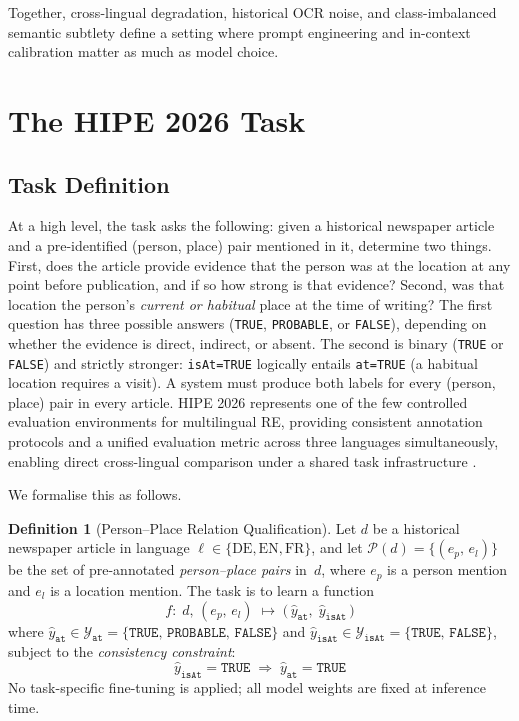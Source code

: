 \documentclass[
]{ceurart}
\theoremstyle{definition}
\newtheorem{defn}{Definition}
\begin{document}
Together, cross-lingual degradation, historical OCR noise, and class-imbalanced semantic subtlety define a setting where prompt engineering and in-context calibration matter as much as model choice.


\section{The HIPE 2026 Task}\label{sec:task}

\subsection{Task Definition}

At a high level, the task asks the following: given a historical newspaper article and a pre-identified (person, place) pair mentioned in it, determine two things.
First, does the article provide evidence that the person was at the location at any point before publication, and if so how strong is that evidence?
Second, was that location the person's \emph{current or habitual} place at the time of writing?
The first question has three possible answers (\texttt{TRUE}, \texttt{PROBABLE}, or \texttt{FALSE}), depending on whether the evidence is direct, indirect, or absent.
The second is binary (\texttt{TRUE} or \texttt{FALSE}) and strictly stronger: \texttt{isAt=TRUE} logically entails \texttt{at=TRUE} (a habitual location requires a visit).
A system must produce both labels for every (person, place) pair in every article.
HIPE 2026 \citep{opitz_extended_2026, opitz_overview_2026} represents one of the few controlled evaluation environments for multilingual RE, providing consistent annotation protocols and a unified evaluation metric across three languages simultaneously, enabling direct cross-lingual comparison under a shared task infrastructure \citep{ali2025multilingual}.

We formalise this as follows.

\begin{defn}[Person--Place Relation Qualification]\label{def:rq}
Let $d$ be a historical newspaper article in language $\ell \in \{\mathrm{DE},\mathrm{EN},\mathrm{FR}\}$, and let
$\mathcal{P}(d) = \{(e_p,\,e_l)\}$
be the set of pre-annotated \emph{person--place pairs} in~$d$, where $e_p$ is a person mention and $e_l$ is a location mention. The task is to learn a function
\begin{equation}\label{eq:task}
  f:\; d,\,(e_p,\,e_l)\;\mapsto\;
  \bigl(\,\hat{y}_{\texttt{at}},\;\hat{y}_{\texttt{isAt}}\,\bigr)
\end{equation}
where $\hat{y}_{\texttt{at}} \in \mathcal{Y}_{\texttt{at}} = \{\texttt{TRUE},\,\texttt{PROBABLE},\,\texttt{FALSE}\}$ and $\hat{y}_{\texttt{isAt}} \in \mathcal{Y}_{\texttt{isAt}} = \{\texttt{TRUE},\,\texttt{FALSE}\}$, subject to the \emph{consistency constraint}:
\begin{equation}\label{eq:constraint}
  \hat{y}_{\texttt{isAt}} = \texttt{TRUE}
  \;\Rightarrow\;
  \hat{y}_{\texttt{at}} = \texttt{TRUE}
\end{equation}
No task-specific fine-tuning is applied; all model weights are fixed at inference time.
\end{defn}
\end{document}
